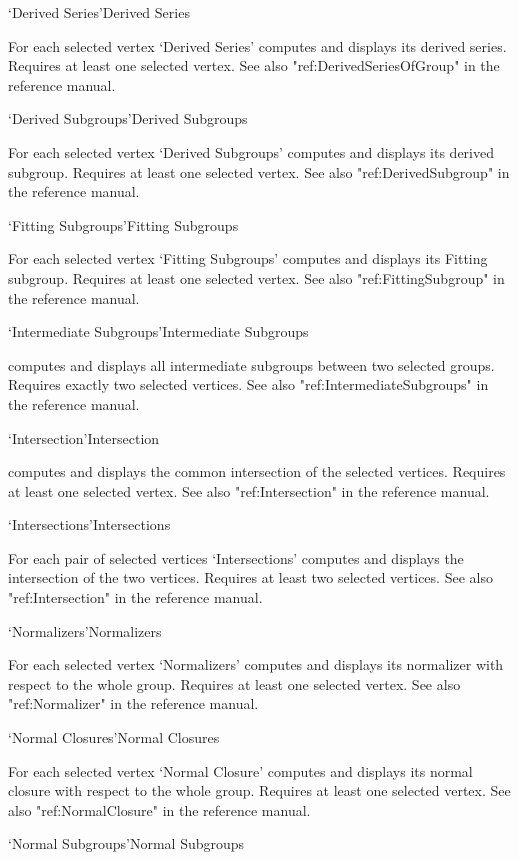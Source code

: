 \>`Derived Series'{Derived Series}

For   each  selected vertex  `Derived  Series'  computes and displays its
derived series.   Requires  at   least  one selected vertex.    See  also
"ref:DerivedSeriesOfGroup" in the {\GAP}
reference manual.

\>`Derived Subgroups'{Derived Subgroups}

For each selected vertex `Derived Subgroups' computes and displays its
derived subgroup.  Requires at least one selected vertex.  See also
"ref:DerivedSubgroup" in the {\GAP}
reference manual.

\>`Fitting Subgroups'{Fitting Subgroups}

For each selected vertex `Fitting Subgroups' computes and displays its
Fitting subgroup.  Requires at least one selected vertex.  See also
"ref:FittingSubgroup" in the {\GAP}
reference manual.

\>`Intermediate Subgroups'{Intermediate Subgroups}

computes and displays all intermediate subgroups between two selected
groups. Requires exactly two selected vertices. See also
"ref:IntermediateSubgroups" in the {\GAP}
reference manual. 

\>`Intersection'{Intersection}

computes and displays the common intersection of the selected vertices.
Requires at least one selected vertex.  See also "ref:Intersection" in the
{\GAP} reference manual.

\>`Intersections'{Intersections}

For each pair of selected vertices `Intersections' computes and displays
the intersection of the two vertices.  Requires at least two selected
vertices.  See also "ref:Intersection" in the {\GAP}
reference manual.

\>`Normalizers'{Normalizers}

For each selected vertex `Normalizers' computes and displays its normalizer
with respect to the whole group.  Requires at least one selected vertex.
See also "ref:Normalizer" in the {\GAP}
reference manual.

\>`Normal Closures'{Normal Closures}

For each selected vertex `Normal Closure' computes and displays its normal
closure with respect to the whole group.  Requires at least one selected
vertex.  See also "ref:NormalClosure" in the {\GAP}
reference manual.

\>`Normal Subgroups'{Normal Subgroups}

